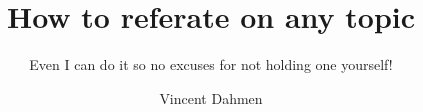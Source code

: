 \title{How to referate on any topic}
\subtitle{Even I can do it so no excuses for not holding one yourself!}
\author{Vincent Dahmen}
